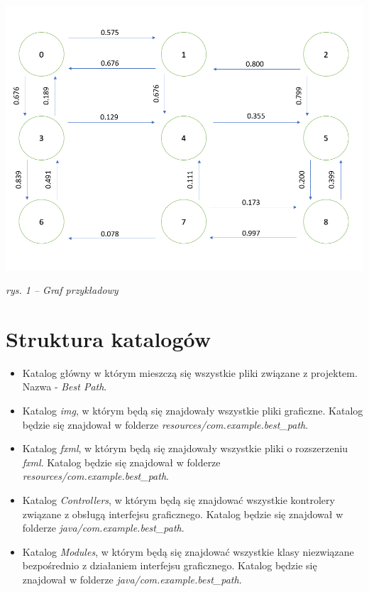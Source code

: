 \documentclass[12pt, a4paper]{article}
\begin{document}
\begin{center}
\includegraphics[width=1.1\textwidth]{graf2.PNG}
\caption{\textit{rys. 1 -- Graf przykładowy} \label{overflow}}
\end{center}


\section{Struktura katalogów}

\begin{itemize}
    \item Katalog główny w którym mieszczą się wszystkie pliki związane z projektem. Nazwa - \textit{Best Path}.
    \item Katalog \textit{img}, w którym będą się znajdowały wszystkie pliki graficzne. Katalog będzie się znajdował w folderze \textit{resources/com.example.best\_path}.
    \item Katalog \textit{fxml}, w którym będą się znajdowały wszystkie pliki o rozszerzeniu \textit{fxml}. Katalog będzie się znajdował w folderze \textit{resources/com.example.best\_path}.
    \item Katalog \textit{Controllers}, w którym będą się znajdować wszystkie kontrolery związane z obsługą interfejsu graficznego. Katalog będzie się znajdował w folderze \textit{java/com.example.best\_path}.
    \item Katalog \textit{Modules}, w którym będą się znajdować wszystkie klasy niezwiązane bezpośrednio z działaniem interfejsu graficznego. Katalog będzie się znajdował w folderze \textit{java/com.example.best\_path}.
\end{itemize}
\end{document}
